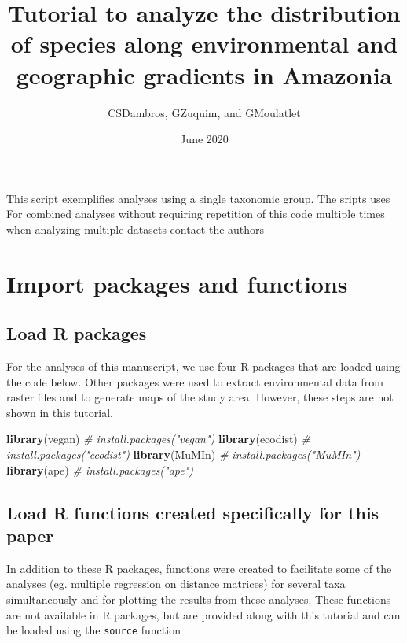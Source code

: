 \documentclass[]{article}
\title{Tutorial to analyze the distribution of species along environmental and
geographic gradients in Amazonia}
\author{CSDambros, GZuquim, and GMoulatlet}
\date{June 2020}
\newenvironment{Shaded}{\begin{snugshade}}{\end{snugshade}}
\newcommand{\CommentTok}[1]{\textcolor[rgb]{0.56,0.35,0.01}{\textit{#1}}}
\newcommand{\KeywordTok}[1]{\textcolor[rgb]{0.13,0.29,0.53}{\textbf{#1}}}
\newcommand{\NormalTok}[1]{#1}
\begin{document}
\maketitle

{
\setcounter{tocdepth}{4}
\tableofcontents
}
\newpage

This script exemplifies analyses using a single taxonomic group. The
sripts uses For combined analyses without requiring repetition of this
code multiple times when analyzing multiple datasets contact the authors

\hypertarget{import-packages-and-functions}{%
\section{Import packages and
functions}\label{import-packages-and-functions}}

\hypertarget{load-r-packages}{%
\subsection{Load R packages}\label{load-r-packages}}

For the analyses of this manuscript, we use four R packages that are
loaded using the code below. Other packages were used to extract
environmental data from raster files and to generate maps of the study
area. However, these steps are not shown in this tutorial.

\begin{Shaded}
\begin{Highlighting}[]
\KeywordTok{library}\NormalTok{(vegan) }\CommentTok{# install.packages("vegan")}
\KeywordTok{library}\NormalTok{(ecodist) }\CommentTok{# install.packages("ecodist")}
\KeywordTok{library}\NormalTok{(MuMIn) }\CommentTok{# install.packages("MuMIn")}
\KeywordTok{library}\NormalTok{(ape) }\CommentTok{# install.packages("ape")}
\end{Highlighting}
\end{Shaded}

\hypertarget{load-r-functions-created-specifically-for-this-paper}{%
\subsection{Load R functions created specifically for this
paper}\label{load-r-functions-created-specifically-for-this-paper}}

In addition to these R packages, functions were created to facilitate
some of the analyses (eg. multiple regression on distance matrices) for
several taxa simultaneously and for plotting the results from these
analyses. These functions are not available in R packages, but are
provided along with this tutorial and can be loaded using the
\texttt{source} function
\end{document}
